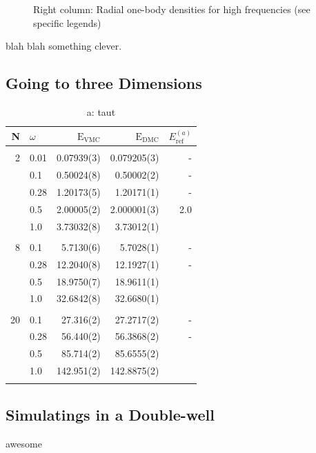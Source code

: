 \begin{figure}
\begin{center}
\begin{tabular}{lr}
  \end{tabular}
  \caption{Right column: Radial one-body densities for high frequencies (see specific legends)}
  \label{fig:OBD_collapsed_w001}
 \end{center}
\end{figure}

\setlength{\tabcolsep}{6pt}
\captionsetup[subfloat]{labelformat=parens}


blah blah something clever.


\subsection{Going to three Dimensions}

\begin{table}
\begin{center}
\begin{tabular}{rl|rrr}
    N     & $\omega$ & $\mathrm{E_{VMC}}$ & $\mathrm{E_{DMC}}$ & $E_\mathrm{ref}^{(a)}$\\
\hline\hline
\multicolumn{5}{c}{} \\
    2     &   0.01   & 0.07939(3)  & 0.079205(3) & -		\\
          &   0.1    & 0.50024(8)  & 0.50002(2)    & - 		\\
          &   0.28   & 1.20173(5)  & 1.20171(1)  & -		\\
          &   0.5    & 2.00005(2)  & 2.000001(3) & 2.0 \\
          &   1.0    & 3.73032(8)  & 3.73012(1)  & \\
\cline{2-5}
\multicolumn{5}{c}{} \\
    8     &   0.1    & 5.7130(6)   & 5.7028(1)   & - 		\\
          &   0.28   & 12.2040(8)  & 12.1927(1)   & -		\\
          &   0.5    & 18.9750(7)  & 18.9611(1) & \\
          &   1.0    & 32.6842(8)  & 32.6680(1)  & \\
\cline{2-5}
\multicolumn{5}{c}{} \\
    20    &   0.1    & 27.316(2)   & 27.2717(2)   & - 		\\
          &   0.28   & 56.440(2)   & 56.3868(2)   & -		\\
          &   0.5    & 85.714(2)   & 85.6555(2)  &  \\
          &   1.0    & 142.951(2)  & 142.8875(2)  & \\
\cline{2-5}
\multicolumn{5}{c}{} \\

     
\hline\hline
\end{tabular}
\caption{a: taut}
\label{tab:QDotsResults3D}
\end{center}
\end{table}


\subsection{Simulatings in a Double-well}

awesome